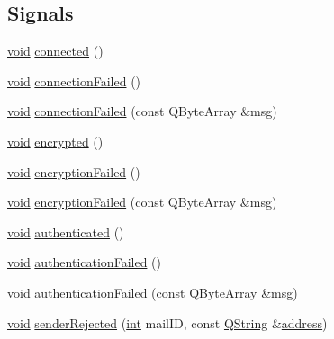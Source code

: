 \subsection*{Signals}
\begin{DoxyCompactItemize}
\item 
\hyperlink{group___u_a_v_objects_plugin_ga444cf2ff3f0ecbe028adce838d373f5c}{void} \hyperlink{class_qxt_smtp_afa0d5d81dcabb8a2ad5da303176fada2}{connected} ()
\item 
\hyperlink{group___u_a_v_objects_plugin_ga444cf2ff3f0ecbe028adce838d373f5c}{void} \hyperlink{class_qxt_smtp_aed78c30a664be67faf08e6e2cf13e4c1}{connection\-Failed} ()
\item 
\hyperlink{group___u_a_v_objects_plugin_ga444cf2ff3f0ecbe028adce838d373f5c}{void} \hyperlink{class_qxt_smtp_a93ac703a41fe7186471b0e73d0c988bf}{connection\-Failed} (const Q\-Byte\-Array \&msg)
\item 
\hyperlink{group___u_a_v_objects_plugin_ga444cf2ff3f0ecbe028adce838d373f5c}{void} \hyperlink{class_qxt_smtp_abbf912e55567e441f8cf41076982ef45}{encrypted} ()
\item 
\hyperlink{group___u_a_v_objects_plugin_ga444cf2ff3f0ecbe028adce838d373f5c}{void} \hyperlink{class_qxt_smtp_ac7e005a129d85c15ad2044ed48dcf4aa}{encryption\-Failed} ()
\item 
\hyperlink{group___u_a_v_objects_plugin_ga444cf2ff3f0ecbe028adce838d373f5c}{void} \hyperlink{class_qxt_smtp_a0211f2820e4dbffc71c4f6835278028f}{encryption\-Failed} (const Q\-Byte\-Array \&msg)
\item 
\hyperlink{group___u_a_v_objects_plugin_ga444cf2ff3f0ecbe028adce838d373f5c}{void} \hyperlink{class_qxt_smtp_aff387f90c7730e17325612c809dff341}{authenticated} ()
\item 
\hyperlink{group___u_a_v_objects_plugin_ga444cf2ff3f0ecbe028adce838d373f5c}{void} \hyperlink{class_qxt_smtp_a311d517fe2003a221f82db82dbcdbf49}{authentication\-Failed} ()
\item 
\hyperlink{group___u_a_v_objects_plugin_ga444cf2ff3f0ecbe028adce838d373f5c}{void} \hyperlink{class_qxt_smtp_a3af9254bfb7212b57232dd57642645fd}{authentication\-Failed} (const Q\-Byte\-Array \&msg)
\item 
\hyperlink{group___u_a_v_objects_plugin_ga444cf2ff3f0ecbe028adce838d373f5c}{void} \hyperlink{class_qxt_smtp_a38f97de9f6afb1e41a5075138e01c155}{sender\-Rejected} (\hyperlink{ioapi_8h_a787fa3cf048117ba7123753c1e74fcd6}{int} mail\-I\-D, const \hyperlink{group___u_a_v_objects_plugin_gab9d252f49c333c94a72f97ce3105a32d}{Q\-String} \&\hyperlink{glext_8h_a86e3d190561a4ae1e195e1a2bcc83db5}{address})

\end{DoxyCompactItemize}
